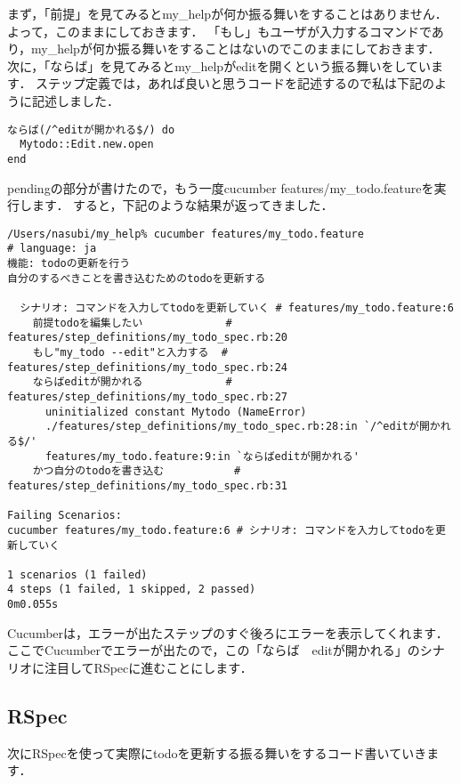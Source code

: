 まず，「前提」を見てみるとmy\_helpが何か振る舞いをすることはありません．
よって，このままにしておきます．
「もし」もユーザが入力するコマンドであり，my\_helpが何か振る舞いをすることはないのでこのままにしておきます．
次に，「ならば」を見てみるとmy\_helpがeditを開くという振る舞いをしています．
ステップ定義では，あれば良いと思うコードを記述するので私は下記のように記述しました．
\begin{lstlisting}[style=customCsh,basicstyle={\scriptsize\ttfamily}]
ならば(/^editが開かれる$/) do
  Mytodo::Edit.new.open
end
\end{lstlisting}
pendingの部分が書けたので，もう一度cucumber features/my\_todo.featureを実行します．
すると，下記のような結果が返ってきました．
\begin{lstlisting}[style=customCsh,basicstyle={\scriptsize\ttfamily}]
/Users/nasubi/my_help% cucumber features/my_todo.feature              
# language: ja
機能: todoの更新を行う
自分のするべきことを書き込むためのtodoを更新する

  シナリオ: コマンドを入力してtodoを更新していく # features/my_todo.feature:6
    前提todoを編集したい             # features/step_definitions/my_todo_spec.rb:20
    もし"my_todo --edit"と入力する  # features/step_definitions/my_todo_spec.rb:24
    ならばeditが開かれる             # features/step_definitions/my_todo_spec.rb:27
      uninitialized constant Mytodo (NameError)
      ./features/step_definitions/my_todo_spec.rb:28:in `/^editが開かれる$/'
      features/my_todo.feature:9:in `ならばeditが開かれる'
    かつ自分のtodoを書き込む           # features/step_definitions/my_todo_spec.rb:31

Failing Scenarios:
cucumber features/my_todo.feature:6 # シナリオ: コマンドを入力してtodoを更新していく

1 scenarios (1 failed)
4 steps (1 failed, 1 skipped, 2 passed)
0m0.055s

\end{lstlisting}
Cucumberは，エラーが出たステップのすぐ後ろにエラーを表示してくれます．
ここでCucumberでエラーが出たので，この「ならば　editが開かれる」のシナリオに注目してRSpecに進むことにします．

\subsection{RSpec}
次にRSpecを使って実際にtodoを更新する振る舞いをするコード書いていきます．

